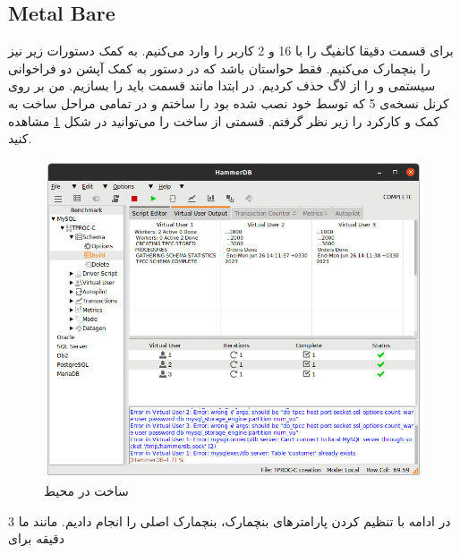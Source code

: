 \subsection{Metal Bare}
برای قسمت
دقیقا کانفیگ
را با 16
و 2 کاربر را وارد
می‌کنیم. به کمک دستورات زیر نیز
را بنچمارک می‌کنیم. فقط حواستان باشد که در دستور
به کمک آپشن
دو فراخوانی سیستمی
 و 
را از لاگ حذف کردیم.
در ابتدا مانند قسمت
باید
را بسازیم. من بر روی کرنل نسخه‌ی 5 که توسط خود
نصب شده بود
را ساختم و در تمامی مراحل ساخت به کمک
 و 
کارکرد
را زیر نظر گرفتم. قسمتی از ساخت
را می‌توانید در شکل
\ref{fig:mysql:baremetal:schema}
مشاهده کنید.
\begin{figure}[H]
    \centering
    \includegraphics[scale=0.5]{pictures/mysql/baremetal/schema-build.png}
    \caption{ساخت  در محیط }
    \label{fig:mysql:baremetal:schema}
\end{figure}
در ادامه با تنظیم کردن پارامتر‌های بنچمارک، بنچمارک اصلی را انجام دادیم.
مانند
ما 3 دقیقه برای
